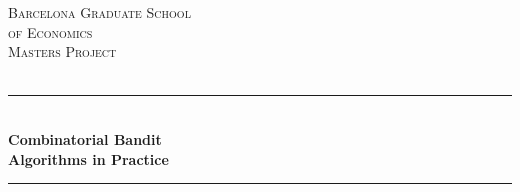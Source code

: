 \begin{titlepage}

\newcommand{\HRule}{\rule{\linewidth}{0.5mm}} %

\center %
 

\textsc{\LARGE Barcelona Graduate School}\\[0.2cm] %
\textsc{\LARGE of Economics}\\[1.5cm] %
\textsc{\Large Masters Project}\\[0.5cm] %
\textsc{\large }\\[0.5cm] %


\HRule \\[0.4cm]
{ \huge \bfseries Combinatorial Bandit}\\[0.4cm] %
{ \huge \bfseries Algorithms in Practice}\\[0.4cm]
\HRule \\[1.5cm]
 



\end{titlepage}
